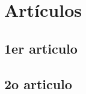 \chapter{Artículos} \label{Inf} 
 
\cleardoublepage

\section{1er articulo}
\lipsum[1-2] %

\cleardoublepage


\section{2o articulo}
\lipsum[1-2] %

\cleardoublepage


